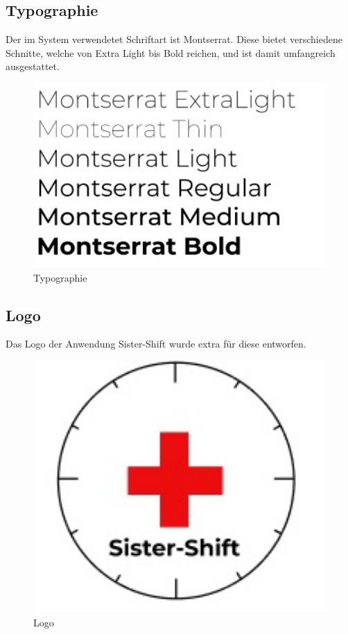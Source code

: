 \documentclass[11pt,
paper=a4,
bibtotocnumbered,	  %
liststotocnumbered,  %
DIV=calc,		  %
tablecaptionabove,	  %
headinclude,
]{article}
\begin{document}
\subsection{Typographie}
Der im System verwendetet Schriftart ist Montserrat. Diese bietet verschiedene Schnitte, welche von Extra Light bis Bold reichen, und ist damit umfangreich ausgestattet.
\begin{figure}[H]
\includegraphics[width=1\textwidth]{Bilder/Typographie.jpg}
\caption{Typographie}
\end{figure}
\subsection{Logo}
Das Logo der Anwendung Sister-Shift wurde extra für diese entworfen. 
\begin{figure}[H]
\includegraphics[width=1\textwidth]{Bilder/Logo.jpg}
\caption{Logo}
\end{figure}
\end{document}
